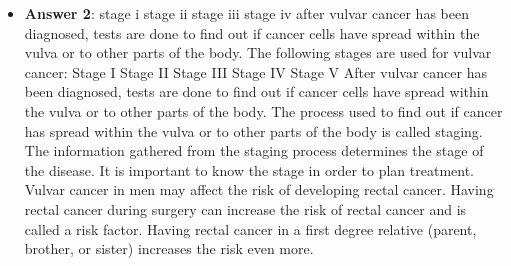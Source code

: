 \begin{enumerate}
\begin{itemize}
					\item \textbf{Answer 2}: stage i stage ii stage iii stage iv after vulvar cancer has been diagnosed, tests are done to find out if cancer cells have spread within the vulva or to other parts of the body. The following stages are used for vulvar cancer: Stage I Stage II Stage III Stage IV Stage V After vulvar cancer has been diagnosed, tests are done to find out if cancer cells have spread within the vulva or to other parts of the body. The process used to find out if cancer has spread within the vulva or to other parts of the body is called staging. The information gathered from the staging process determines the stage of the disease. It is important to know the stage in order to plan treatment. Vulvar cancer in men may affect the risk of developing rectal cancer. Having rectal cancer during surgery can increase the risk of rectal cancer and is called a risk factor. Having rectal cancer in a first degree relative (parent, brother, or sister) increases the risk even more.
				\end{itemize}	
		\end{enumerate}
	